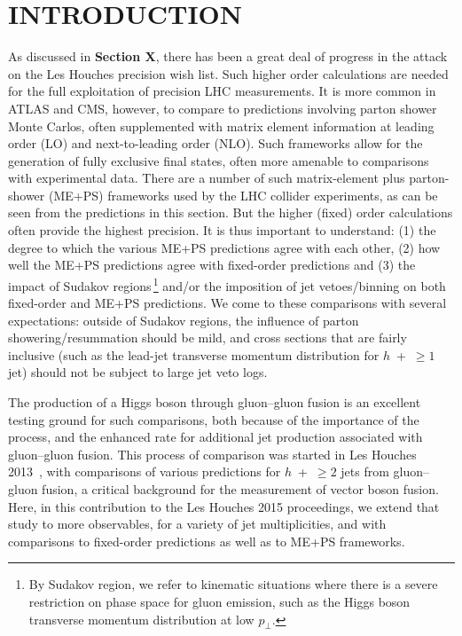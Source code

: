 \section{INTRODUCTION}
\label{sec:hjetscomp:intro}

As discussed in \textbf{Section X}, there has been a great deal of progress in
the attack on the Les Houches precision wish list. Such higher order
calculations are needed for the full exploitation of precision LHC
measurements. It is more common in ATLAS and CMS, however, to compare
to predictions involving parton shower Monte Carlos, often
supplemented with matrix element information at leading order (LO) and
next-to-leading order (NLO). Such frameworks allow for the generation
of fully exclusive final states, often more amenable to comparisons
with experimental data. There are a number of such matrix-element plus
parton-shower (ME+PS) frameworks used by the LHC collider experiments,
as can be seen from the predictions in this section. But the higher
(fixed) order calculations often provide the highest precision. It is
thus important to understand: (1) the degree to which the various
ME+PS predictions agree with each other, (2) how well the ME+PS
predictions agree with fixed-order predictions and (3) the impact of
Sudakov regions\,\footnote{By Sudakov region, we refer to kinematic
situations where there is a severe restriction on phase space for
gluon emission, such as the Higgs boson transverse momentum
distribution at low $p_\perp$.} and/or the imposition of jet
vetoes/binning on both fixed-order and ME+PS predictions.  We come to
these comparisons with several expectations: outside of Sudakov regions, the
influence of parton showering/resummation should be mild, and cross
sections that are fairly inclusive (such as the lead-jet transverse
momentum distribution for $h$~+~$\ge1$ jet) should not be subject to
large jet veto logs.

The production of a Higgs boson through gluon--gluon fusion is an
excellent testing ground for such comparisons, both because of the
importance of the process, and the enhanced rate for additional jet
production associated with gluon--gluon fusion. This process of
comparison was started in Les Houches
2013~\cite{AlcarazMaestre:2012vp}, with comparisons of various
predictions for $h$~+~$\ge2$ jets from gluon--gluon fusion, a critical
background for the measurement of vector boson fusion. Here, in this
contribution to the Les Houches 2015 proceedings, we extend that study
to more observables, for a variety of jet multiplicities, and with
comparisons to fixed-order predictions as well as to ME+PS frameworks.

